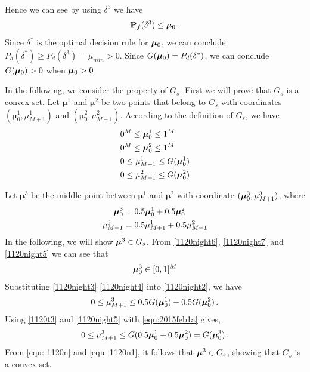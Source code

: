 Hence we can see by using $\delta^3$ we have
\[
  \mathbf{P}_f(\delta^3) \leq \boldsymbol{\mu}_0\,.
\]
Since $\delta^\ast $ is the optimal decision rule for $\boldsymbol{\mu}_0$, we can conclude $P_d(\delta^\ast) \geq  P_d(\delta^3) = \mu_{min} >  0$. Since $G(\boldsymbol{\mu}_0) = P_d(\delta^\ast)$, we can conclude $G(\boldsymbol{\mu}_0) > 0$ when $\boldsymbol{\mu}_0 > 0 $. 


In the following, we consider the property of $G_s$. First we will prove that $G_s$ is a convex set. 
Let $\boldsymbol{\mu}^1$ and  $\boldsymbol{\mu}^2$ be two points that belong to $G_s$ with coordinates $(\boldsymbol{\mu}^1_0, \mu_{M+1}^1)$ and $(\boldsymbol{\mu}^2_0, \mu_{M+1}^2)$. According to the definition of $G_s$, we have 
\begin{subequations}
\label{1120t4}
\begin{align}
\label{1120night6}
&0^M \leq \boldsymbol{\mu}_0^1 \leq 1^M\\
\label{1120night7}
&0^M \leq \boldsymbol{\mu}^2_0 \leq 1^M\\
\label{1120night3}
&0 \leq \mu_{M+1}^1 \leq G(\boldsymbol{\mu}_0^1)\\
\label{1120night4}
&0 \leq \mu_{M+1}^2 \leq G(\boldsymbol{\mu}_0^2)
\end{align}
\end{subequations}

Let $\boldsymbol{\mu}^3$ be the middle point between $\boldsymbol{\mu}^1$ and $\boldsymbol{\mu}^2$ with coordinate $(\boldsymbol{\mu}_0^3, \mu_{M+1}^3)$, where  
\begin{subequations}
\label{1120t5}
\begin{align}
\label{1120night5}
\boldsymbol{\mu}_0^3 &= 0.5\boldsymbol{\mu}_0^1 + 0.5 \boldsymbol{\mu}_0^2\\
\label{1120night2}
\mu_{M+1}^3 &= 0.5 \mu_{M+1}^1 + 0.5 \mu_{M+1}^2
\end{align}
\end{subequations}
In the following, we will show $\boldsymbol{\mu}^3 \in G_s$.  
From \eqref{1120night6}, \eqref{1120night7} and \eqref{1120night5} we can see that
\begin{equation}
\label{equ: 1120n1}
\boldsymbol{\mu}_0^3 \in [0, 1]^M
\end{equation}
Substituting \eqref{1120night3} \eqref{1120night4} into \eqref{1120night2}, we have
\begin{equation}
  \label{equ:2015feb1a}
0 \leq \mu_{M+1}^3 \leq 0.5 G( \boldsymbol{\mu}_0^1) + 0.5G(\boldsymbol{\mu}_0^2)\,.
\end{equation} 
Using \eqref{1120t3} and \eqref{1120night5} with \eqref{equ:2015feb1a} gives,
\begin{equation}
\label{equ: 1120n}
0 \leq \mu_{M+1}^3 \leq G(0.5 \boldsymbol{\mu}_0^1 + 0.5\boldsymbol{\mu}_0^2) = G(\boldsymbol{\mu}_0^3)\,.
\end{equation}
From \eqref{equ: 1120n} and \eqref{equ: 1120n1}, it follows that  
 $\boldsymbol{\mu}^3 \in G_s$, showing that $G_s$  is a convex set.  

